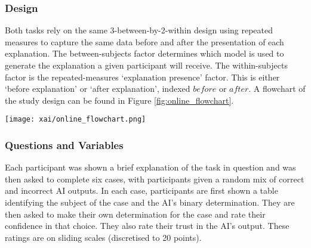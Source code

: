 \subsubsection{Design}
Both tasks rely on the same 3-between-by-2-within design using repeated measures to capture the same data before and after the presentation of each explanation. The between-subjects factor determines which model is used to generate the explanation a given participant will receive. The within-subjects factor is the repeated-measures `explanation presence' factor. This is either `before explanation' or `after explanation', indexed $before$ or $after$. A flowchart of the study design can be found in Figure \ref{fig:online_flowchart}.

\begin{figure*}[htbp]
    \centering
    \texttt{[image: xai/online\_flowchart.png]}
    \caption{Participants in the online study are sorted into six buckets, where each bucket is segregated by explanatory condition and task and shown a brief description of the task (i.e., each participant sees only one of the explanations in Figure \ref{fig:online_explanations}). Then, each participant is shown 6 cases. In each case, participants are shown an applicant profile and an AI output. Participants are asked to agree or disagree with the AI output. Then, participants are given explanations based on their explanatory condition scores. They are then asked again to agree or disagree with the AI output.}
    \label{fig:online_flowchart}
\end{figure*}


\subsubsection{Questions and Variables}\label{sssec:q_and_v}
Each participant was shown a brief explanation of the task in question and was then asked to complete six cases, with participants given a random mix of correct and incorrect AI outputs. In each case, participants are first shown a table identifying the subject of the case and the AI's binary determination. They are then asked to make their own determination for the case and rate their confidence in that choice. They also rate their trust in the AI's output. These ratings are on sliding scales (discretised to 20 points).

